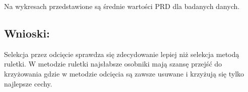     Na wykresach przedstawione są średnie wartości PRD dla badanych danych.
  \subsection{Wnioski: }
  Selekcja przez odcięcie sprawdza się zdecydowanie lepiej niż selekcja metodą ruletki. W metodzie ruletki najsłabsze osobniki mają szansę przejść do krzyżowania gdzie w metodzie odcięcia są zawsze usuwane i krzyżują się tylko najlepsze cechy.
